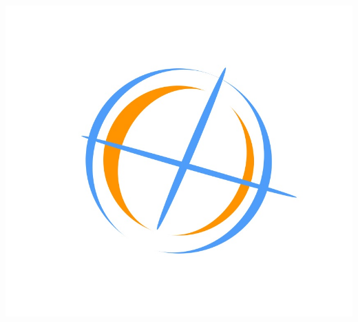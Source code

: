 \documentclass[journal,noindent,headline,12pt]{paper}
\begin{document}
\begin{flushright}
	\includegraphics[scale=0.2]{logo1}
\end{flushright}




\end{document}
